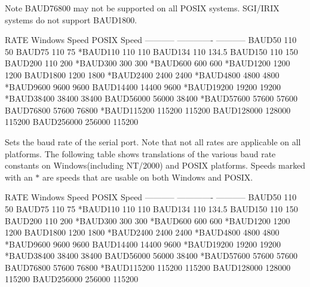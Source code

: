 \begin{DoxyNote}{Note}
B\-A\-U\-D76800 may not be supported on all P\-O\-S\-I\-X systems. S\-G\-I/\-I\-R\-I\-X systems do not support B\-A\-U\-D1800.
\end{DoxyNote}
\begin{DoxyVerb}  RATE          Windows Speed   POSIX Speed
  -----------   -------------   -----------
   BAUD50                 110          50
   BAUD75                 110          75
  *BAUD110                110         110
   BAUD134                110         134.5
   BAUD150                110         150
   BAUD200                110         200
  *BAUD300                300         300
  *BAUD600                600         600
  *BAUD1200              1200        1200
   BAUD1800              1200        1800
  *BAUD2400              2400        2400
  *BAUD4800              4800        4800
  *BAUD9600              9600        9600
   BAUD14400            14400        9600
  *BAUD19200            19200       19200
  *BAUD38400            38400       38400
   BAUD56000            56000       38400
  *BAUD57600            57600       57600
   BAUD76800            57600       76800
  *BAUD115200          115200      115200
   BAUD128000          128000      115200
   BAUD256000          256000      115200
\end{DoxyVerb}


Sets the baud rate of the serial port. Note that not all rates are applicable on all platforms. The following table shows translations of the various baud rate constants on Windows(including N\-T/2000) and P\-O\-S\-I\-X platforms. Speeds marked with an $\ast$ are speeds that are usable on both Windows and P\-O\-S\-I\-X. \begin{DoxyVerb}  RATE          Windows Speed   POSIX Speed
  -----------   -------------   -----------
   BAUD50                 110          50
   BAUD75                 110          75
  *BAUD110                110         110
   BAUD134                110         134.5
   BAUD150                110         150
   BAUD200                110         200
  *BAUD300                300         300
  *BAUD600                600         600
  *BAUD1200              1200        1200
   BAUD1800              1200        1800
  *BAUD2400              2400        2400
  *BAUD4800              4800        4800
  *BAUD9600              9600        9600
   BAUD14400            14400        9600
  *BAUD19200            19200       19200
  *BAUD38400            38400       38400
   BAUD56000            56000       38400
  *BAUD57600            57600       57600
   BAUD76800            57600       76800
  *BAUD115200          115200      115200
   BAUD128000          128000      115200
   BAUD256000          256000      115200
\end{DoxyVerb}
 

